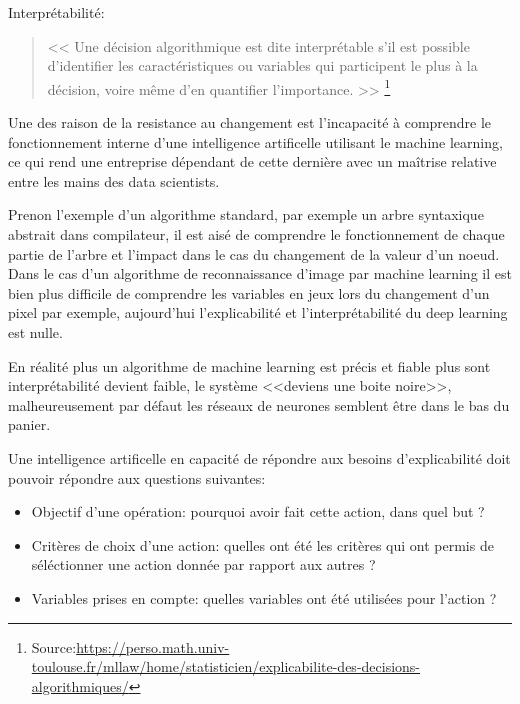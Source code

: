             Interprétabilité:
            \begin{quote}
                << Une décision algorithmique est dite interprétable s’il est possible d’identifier 
                les caractéristiques ou variables qui participent le plus à la décision, 
                voire même d’en quantifier l’importance. >>
                \footnote{Source:\url{https://perso.math.univ-toulouse.fr/mllaw/home/statisticien/explicabilite-des-decisions-algorithmiques/}}
                \newline
            \end{quote}

            Une des raison de la resistance au changement est l'incapacité à comprendre 
            le fonctionnement interne d'une intelligence artificelle utilisant le machine learning, 
            ce qui rend une entreprise dépendant de cette dernière avec un maîtrise relative
            entre les mains des data scientists. \newline

            Prenon l'exemple d'un algorithme standard, par exemple un arbre syntaxique abstrait
            dans compilateur, il est aisé de comprendre le fonctionnement de chaque partie 
            de l'arbre et l'impact dans le cas du changement de la valeur d'un noeud.
            Dans le cas d'un algorithme de reconnaissance d'image par machine learning 
            il est bien plus difficile de comprendre les variables en jeux lors du changement 
            d'un pixel par exemple, aujourd'hui l'explicabilité et l'interprétabilité
            du deep learning est nulle. \newline


            En réalité plus un algorithme de machine learning est précis et fiable 
            plus sont interprétabilité devient faible, le système <<deviens une boite 
            noire>>, malheureusement par défaut les réseaux de neurones semblent 
            être dans le bas du panier. \newline 
            
            Une intelligence artificelle en capacité de répondre aux besoins d'explicabilité 
            doit pouvoir répondre aux questions suivantes: \newline 

            \begin{itemize}
                \item Objectif d'une opération: pourquoi avoir fait cette action, 
                dans quel but ? \newline 
                \item Critères de choix d'une action: quelles ont été les critères 
                qui ont permis de séléctionner une action donnée par rapport aux 
                autres ? \newline
                \item Variables prises en compte: quelles variables ont été utilisées
                pour l'action ? \newline 
            \end{itemize}

